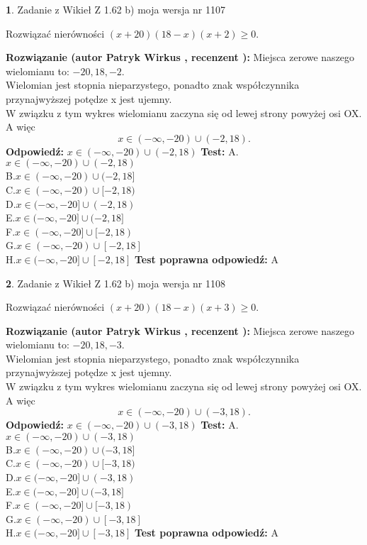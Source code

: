 \documentclass[12pt, a4paper]{article}
\theoremstyle{definition} %
\newtheorem{zad}{}
\newcommand{\zadStart}[1]{\begin{zad}#1\newline}
\newcommand{\zadStop}{\end{zad}}
\newcommand{\rozwStart}[2]{\noindent \textbf{Rozwiązanie (autor #1 , recenzent #2): }\newline}
\newcommand{\rozwStop}{\newline}
\newcommand{\odpStart}{\noindent \textbf{Odpowiedź:}\newline}
\newcommand{\odpStop}{\newline}
\newcommand{\testStart}{\noindent \textbf{Test:}\newline}
\newcommand{\testStop}{\newline}
\newcommand{\kluczStart}{\noindent \textbf{Test poprawna odpowiedź:}\newline}
\newcommand{\kluczStop}{\newline}
\begin{document}
\zadStart{Zadanie z Wikieł Z 1.62 b) moja wersja nr 1107}

Rozwiązać nierówności $(x+20)(18-x)(x+2)\ge0$.
\zadStop
\rozwStart{Patryk Wirkus}{}
Miejsca zerowe naszego wielomianu to: $-20, 18, -2$.\\
Wielomian jest stopnia nieparzystego, ponadto znak współczynnika przy\linebreak najwyższej potędze x jest ujemny.\\ W związku z tym wykres wielomianu zaczyna się od lewej strony powyżej osi OX. A więc $$x \in (-\infty,-20) \cup (-2,18).$$
\rozwStop
\odpStart
$x \in (-\infty,-20) \cup (-2,18)$
\odpStop
\testStart
A.$x \in (-\infty,-20) \cup (-2,18)$\\
B.$x \in (-\infty,-20) \cup (-2,18]$\\
C.$x \in (-\infty,-20) \cup [-2,18)$\\
D.$x \in (-\infty,-20] \cup (-2,18)$\\
E.$x \in (-\infty,-20] \cup (-2,18]$\\
F.$x \in (-\infty,-20] \cup [-2,18)$\\
G.$x \in (-\infty,-20) \cup [-2,18]$\\
H.$x \in (-\infty,-20] \cup [-2,18]$
\testStop
\kluczStart
A
\kluczStop



\zadStart{Zadanie z Wikieł Z 1.62 b) moja wersja nr 1108}

Rozwiązać nierówności $(x+20)(18-x)(x+3)\ge0$.
\zadStop
\rozwStart{Patryk Wirkus}{}
Miejsca zerowe naszego wielomianu to: $-20, 18, -3$.\\
Wielomian jest stopnia nieparzystego, ponadto znak współczynnika przy\linebreak najwyższej potędze x jest ujemny.\\ W związku z tym wykres wielomianu zaczyna się od lewej strony powyżej osi OX. A więc $$x \in (-\infty,-20) \cup (-3,18).$$
\rozwStop
\odpStart
$x \in (-\infty,-20) \cup (-3,18)$
\odpStop
\testStart
A.$x \in (-\infty,-20) \cup (-3,18)$\\
B.$x \in (-\infty,-20) \cup (-3,18]$\\
C.$x \in (-\infty,-20) \cup [-3,18)$\\
D.$x \in (-\infty,-20] \cup (-3,18)$\\
E.$x \in (-\infty,-20] \cup (-3,18]$\\
F.$x \in (-\infty,-20] \cup [-3,18)$\\
G.$x \in (-\infty,-20) \cup [-3,18]$\\
H.$x \in (-\infty,-20] \cup [-3,18]$
\testStop
\kluczStart
A
\kluczStop
\end{document}
